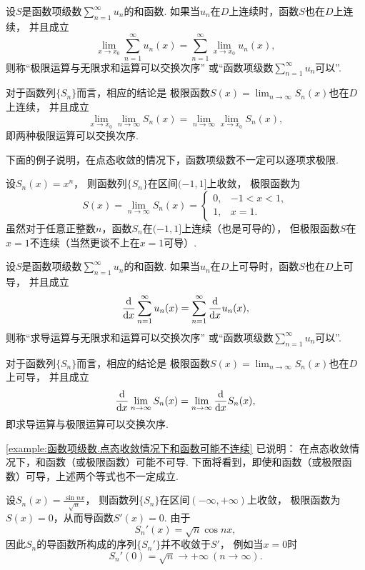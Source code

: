\begin{definition}
设\(S\)是函数项级数\(\sum_{n=1}^\infty u_n\)的和函数.
如果当\(u_n\)在\(D\)上连续时，函数\(S\)也在\(D\)上连续，
并且成立\[
	\lim_{x \to x_0} \sum_{n=1}^\infty u_n(x)
	= \sum_{n=1}^\infty \lim_{x \to x_0} u_n(x),
\]
则称“极限运算与无限求和运算可以交换次序”
或“函数项级数\(\sum_{n=1}^\infty u_n\)可以”.
\end{definition}
对于函数列\(\{S_n\}\)而言，相应的结论是
极限函数\(S(x) = \lim_{n\to\infty} S_n(x)\)也在\(D\)上连续，
并且成立\[
	\lim_{x \to x_0} \lim_{n\to\infty} S_n(x)
	= \lim_{n\to\infty} \lim_{x \to x_0} S_n(x),
\]
即两种极限运算可以交换次序.

下面的例子说明，在点态收敛的情况下，函数项级数不一定可以逐项求极限.
\begin{example}\label{example:函数项级数.点态收敛情况下和函数可能不连续}
设\(S_n(x) = x^n\)，
则函数列\(\{S_n\}\)在区间\((-1,1]\)上收敛，
极限函数为\[
	S(x) = \lim_{n\to\infty} S_n(x)
	= \left\{ \begin{array}{ll}
		0, & -1<x<1, \\
		1, & x=1.
	\end{array} \right.
\]
虽然对于任意正整数\(n\)，函数\(S_n\)在\((-1,1]\)上连续（也是可导的），
但极限函数\(S\)在\(x=1\)不连续（当然更谈不上在\(x=1\)可导）.
\end{example}

\begin{definition}
设\(S\)是函数项级数\(\sum_{n=1}^\infty u_n\)的和函数.
如果当\(u_n\)在\(D\)上可导时，函数\(S\)也在\(D\)上可导，
并且成立\[
	\dv{x} \sum_{n=1}^\infty u_n(x)
	= \sum_{n=1}^\infty \dv{x} u_n(x),
\]
则称“求导运算与无限求和运算可以交换次序”
或“函数项级数\(\sum_{n=1}^\infty u_n\)可以”.
\end{definition}
对于函数列\(\{S_n\}\)而言，相应的结论是
极限函数\(S(x) = \lim_{n\to\infty} S_n(x)\)也在\(D\)上可导，
并且成立\[
	\dv{x} \lim_{n\to\infty} S_n(x)
	= \lim_{n\to\infty} \dv{x} S_n(x),
\]
即求导运算与极限运算可以交换次序.

\cref{example:函数项级数.点态收敛情况下和函数可能不连续} 已说明：
在点态收敛情况下，和函数（或极限函数）可能不可导.
下面将看到，即使和函数（或极限函数）可导，上述两个等式也不一定成立.
\begin{example}
设\(S_n(x) = \frac{\sin nx}{\sqrt{n}}\)，
则函数列\(\{S_n\}\)在区间\((-\infty,+\infty)\)上收敛，
极限函数为\(S(x) = 0\)，从而导函数\(S'(x) = 0\).
由于\[
	S_n'(x) = \sqrt{n} \cos nx,
\]
因此\(S_n\)的导函数所构成的序列\(\{S_n'\}\)并不收敛于\(S'\)，
例如当\(x=0\)时\[
	S_n'(0) = \sqrt{n}\to+\infty\ (n\to\infty).
\]
\end{example}

